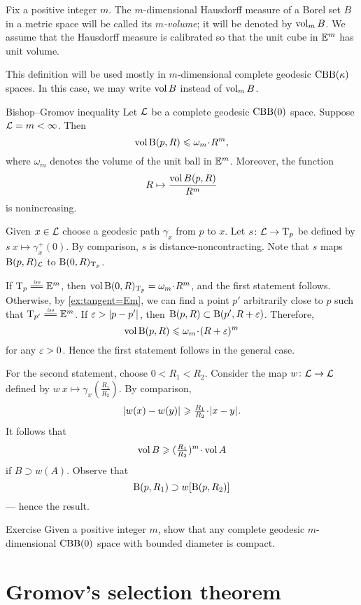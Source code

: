 Fix a positive integer $m$.
The $m$-dimensional Hausdorff measure of a Borel set $B$ in a metric space will be called its \emph{$m$-volume}; it will be denoted by $\operatorname{\rm vol}\nolimits_m B$.
We assume that the Hausdorff measure is calibrated so that the unit cube in $\mathbb{E}^m$ has unit volume.

This definition will be used mostly in $m$-dimensional complete geodesic $\mathrm{CBB}(\kappa)$ spaces.
In this case, we may write $\operatorname{\rm vol}\nolimits B$ instead of $\operatorname{\rm vol}\nolimits_m B$.


\begin{thm}{Bishop--Gromov inequality}
Let $\mathcal{L}$ be a complete geodesic $\mathrm{CBB}(0)$ space.
Suppose $\mathcal{L}=m<\infty$.
Then 
\[\vol \oBall(p,R)\le \omega_m\cdot R^m,\]
where $\omega_m$ denotes the volume of the unit ball in $\mathbb{E}^m$.
Moreover, the function 
\[R\mapsto \frac{\operatorname{\rm vol}\nolimits B(p,R)}{R^m}\]
is nonincreasing.
\end{thm}

Given $x\in\mathcal{L}$ choose a geodesic path $\gamma_x$ from $p$ to $x$.
Let $s\colon\mathcal{L}\to \mathrm{T}_p$ be defined by $s\:x\mapsto \gamma_x^+(0)$.
By comparison, $s$ is distance-noncontracting.
Note that $s$ maps $\mathrm{B}{}(p,R)_{\mathcal{L}}$ to $\mathrm{B}{}(0,R)_{\mathrm{T}_p}$.

If $\T_p\iso \EE^m$, then $\vol\oBall(0,R)_{\T_p}=\omega_m\cdot R^m$,
and the first statement follows.
Otherwise, by \ref{ex:tangent=Em}, we can find a point $p'$ arbitrarily close to $p$ such that $\T_{p'}\iso \EE^m$.
If $\eps>\dist{p}{p'}{}$, then $\mathrm{B}{}(p,R)\subset \mathrm{B}{}(p',R+\varepsilon)$.
Therefore,
\[\vol \oBall(p,R)\le \omega_m\cdot (R+\eps)^m\]
for any $\varepsilon>0$.
Hence the first statement follows in the general case.

For the second statement, choose $0<R_1<R_2$.
Consider the map $w\colon \mathcal{L}\to \mathcal{L}$ defined by $w\:x\mapsto \gamma_x(\tfrac {R_1}{R_2})$.
By comparison,
\[\dist{w(x)}{w(y)}{}\ge \tfrac {R_1}{R_2}\cdot \dist{x}{y}{}.\]
It follows that 
\[\vol B\ge (\tfrac {R_1}{R_2})^m\cdot\vol A\]
if $B\supset w(A)$.
Observe that 
\[\mathrm{B}{}(p,R_1) \supset w[\mathrm{B}{}(p,R_2)]\]
--- hence the result.
\qeds

\begin{thm}{Exercise}\label{ex:diam-compact}
Given a positive integer $m$, 
show that any complete geodesic $m$-dimensional $\mathrm{CBB}(0)$ space with bounded diameter is compact.
\end{thm}

\section{Gromov's selection theorem}

